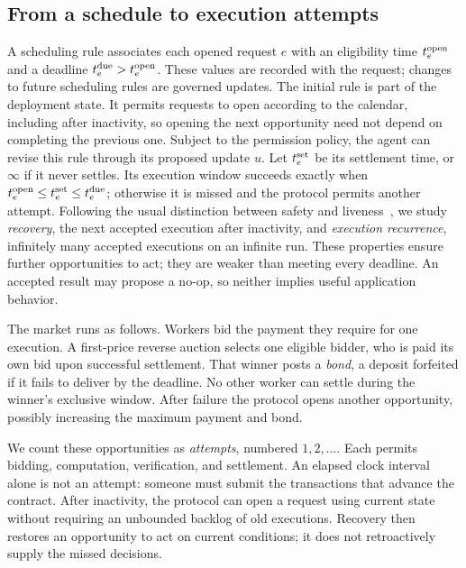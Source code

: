 \documentclass[10pt,letterpaper]{article}
\begin{document}
\subsection{From a schedule to execution attempts}
A scheduling rule associates each opened request $e$ with an eligibility time $t_e^{\rm open}$ and a deadline $t_e^{\rm due}>t_e^{\rm open}$. These values are recorded with the request; changes to future scheduling rules are governed updates. The initial rule is part of the deployment state. It permits requests to open according to the calendar, including after inactivity, so opening the next opportunity need not depend on completing the previous one. Subject to the permission policy, the agent can revise this rule through its proposed update $u$. Let $t_e^{\rm set}$ be its settlement time, or $\infty$ if it never settles. Its execution window succeeds exactly when $t_e^{\rm open}\leq t_e^{\rm set}\leq t_e^{\rm due}$; otherwise it is missed and the protocol permits another attempt. Following the usual distinction between safety and liveness~\citep{alpern1985}, we study \emph{recovery}, the next accepted execution after inactivity, and \emph{execution recurrence}, infinitely many accepted executions on an infinite run. These properties ensure further opportunities to act; they are weaker than meeting every deadline. An accepted result may propose a no-op, so neither implies useful application behavior.

The market runs as follows. Workers bid the payment they require for one execution. A first-price reverse auction selects one eligible bidder, who is paid its own bid upon successful settlement. That winner posts a \emph{bond}, a deposit forfeited if it fails to deliver by the deadline. No other worker can settle during the winner's exclusive window. After failure the protocol opens another opportunity, possibly increasing the maximum payment and bond.

We count these opportunities as \emph{attempts}, numbered $1,2,\ldots$. Each permits bidding, computation, verification, and settlement. An elapsed clock interval alone is not an attempt: someone must submit the transactions that advance the contract. After inactivity, the protocol can open a request using current state without requiring an unbounded backlog of old executions. Recovery then restores an opportunity to act on current conditions; it does not retroactively supply the missed decisions.
\end{document}
